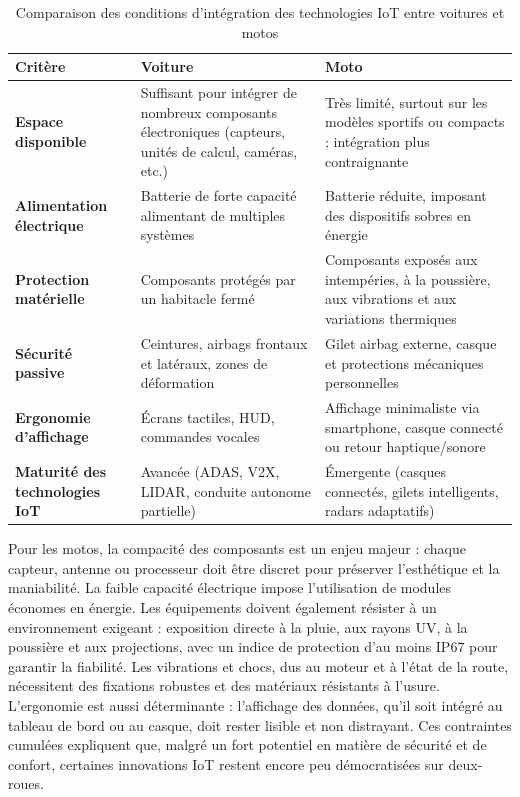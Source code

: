 \begin{table}[H]
\centering
\caption{Comparaison des conditions d’intégration des technologies IoT entre voitures et motos}
\label{tab:comparaison_iot_voiture_moto}
\renewcommand{\arraystretch}{1.15}
\begin{tabular}{|p{3.2cm}|p{6.5cm}|p{6.5cm}|}
\hline
\textbf{Critère} & \textbf{Voiture} & \textbf{Moto} \\
\hline
\textbf{Espace disponible} &
Suffisant pour intégrer de nombreux composants électroniques (capteurs, unités de calcul, caméras, etc.) &
Très limité, surtout sur les modèles sportifs ou compacts ; intégration plus contraignante \\
\hline
\textbf{Alimentation électrique} &
Batterie de forte capacité alimentant de multiples systèmes &
Batterie réduite, imposant des dispositifs sobres en énergie \\
\hline
\textbf{Protection matérielle} &
Composants protégés par un habitacle fermé &
Composants exposés aux intempéries, à la poussière, aux vibrations et aux variations thermiques \\
\hline
\textbf{Sécurité passive} &
Ceintures, airbags frontaux et latéraux, zones de déformation &
Gilet airbag externe, casque et protections mécaniques personnelles \\
\hline
\textbf{Ergonomie d’affichage} &
Écrans tactiles, HUD, commandes vocales &
Affichage minimaliste via smartphone, casque connecté ou retour haptique/sonore \\
\hline
\textbf{Maturité des technologies IoT} &
Avancée (ADAS, V2X, LIDAR, conduite autonome partielle) &
Émergente (casques connectés, gilets intelligents, radars adaptatifs) \\
\hline
\end{tabular}
\end{table}

Pour les motos, la compacité des composants est un enjeu majeur : chaque capteur, antenne ou processeur doit être discret pour préserver l’esthétique et la maniabilité. La faible capacité électrique impose l’utilisation de modules économes en énergie. Les équipements doivent également résister à un environnement exigeant : exposition directe à la pluie, aux rayons UV, à la poussière et aux projections, avec un indice de protection d’au moins IP67 pour garantir la fiabilité.
Les vibrations et chocs, dus au moteur et à l’état de la route, nécessitent des fixations robustes et des matériaux résistants à l’usure. L’ergonomie est aussi déterminante : l’affichage des données, qu’il soit intégré au tableau de bord ou au casque, doit rester lisible et non distrayant. Ces contraintes cumulées expliquent que, malgré un fort potentiel en matière de sécurité et de confort, certaines innovations IoT restent encore peu démocratisées sur deux-roues.


